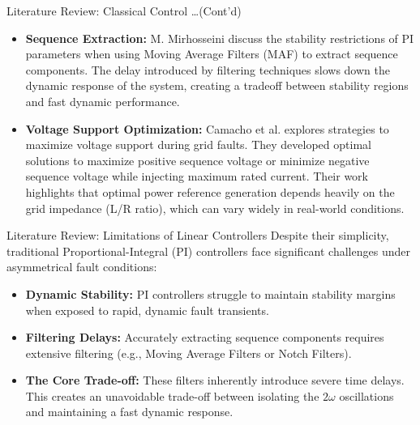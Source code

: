 \documentclass[aspectratio=169]{beamer}
\begin{document}
\begin{frame}{Literature Review: Classical Control \dots(Cont'd) }
    \vspace{0.3cm}
    \begin{itemize}
        \item \textbf{Sequence Extraction:} M. Mirhosseini discuss the stability restrictions
            of PI parameters when using Moving Average Filters (MAF) to extract sequence components.
            The delay introduced by filtering techniques slows down the dynamic response of the system,
            creating a tradeoff between stability regions and fast dynamic performance.
        \item \textbf{Voltage Support Optimization:} Camacho et al. explores strategies to maximize voltage
            support during grid faults. They developed optimal solutions to maximize positive sequence
            voltage or minimize negative sequence voltage while injecting maximum rated current. Their
            work highlights that optimal power reference generation depends heavily on the grid impedance
            (L/R ratio), which can vary widely in real-world conditions.
    \end{itemize}
\end{frame}

\begin{frame}{Literature Review: Limitations of Linear Controllers}
    Despite their simplicity, traditional Proportional-Integral (PI) controllers face significant
    challenges under asymmetrical fault conditions:
    \vspace{0.3cm}
    \begin{itemize}
        \item \textbf{Dynamic Stability:} PI controllers struggle to maintain stability margins when 
        exposed to rapid, dynamic fault transients.
        \item \textbf{Filtering Delays:} Accurately extracting sequence components requires extensive 
        filtering (e.g., Moving Average Filters or Notch Filters).
        \item \textbf{The Core Trade-off:} These filters inherently introduce severe time delays. 
        This creates an unavoidable trade-off between isolating the $2\omega$ oscillations and maintaining
        a fast dynamic response.
    \end{itemize}
\end{frame}
\end{document}
